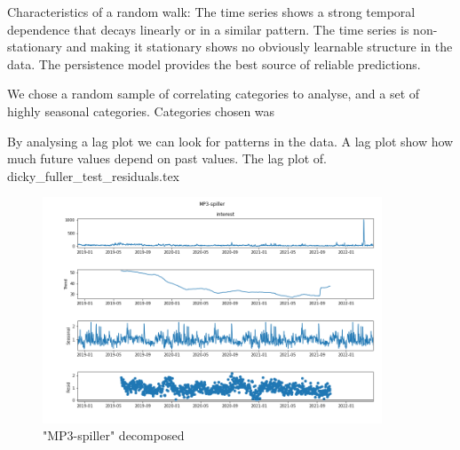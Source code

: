 Characteristics of a random walk:
The time series shows a strong temporal dependence that decays linearly or in a similar pattern.
The time series is non-stationary and making it stationary shows no obviously learnable structure in the data.
The persistence model provides the best source of reliable predictions.

We chose a random sample of correlating categories to analyse,
and a set of highly seasonal categories.
Categories chosen was
%



By analysing a lag plot we can look for patterns in the data. A lag plot
show how much future values depend on past values.
The lag plot of.
{dicky_fuller_test_residuals.tex}

\begin{figure}[H]
  \centering
  \includegraphics[width=0.9\textwidth]{./figs/code_generated/time-serie-MP3-spiller_decomposed.png}
  \hfill
  \caption{"MP3-spiller" decomposed}
  \label{fig:dataset:mp3-spiller-decomposed}
\end{figure}


